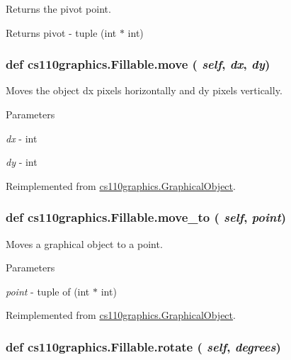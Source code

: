Returns the pivot point. \begin{DoxyReturn}{Returns}
pivot -\/ tuple (int $\ast$ int) 
\end{DoxyReturn}
\hypertarget{classcs110graphics_1_1Fillable_ae8f6c476e29c0810453dc16948e1730c}{
\subsubsection[{move}]{\setlength{\rightskip}{0pt plus 5cm}def cs110graphics.Fillable.move ( {\em self}, \/   {\em dx}, \/   {\em dy})}}
\label{classcs110graphics_1_1Fillable_ae8f6c476e29c0810453dc16948e1730c}


Moves the object dx pixels horizontally and dy pixels vertically. 
\begin{DoxyParams}{Parameters}
\item[{\em dx}]-\/ int \item[{\em dy}]-\/ int \end{DoxyParams}


Reimplemented from \hyperlink{classcs110graphics_1_1GraphicalObject_aa64d270fb83efa4a54e1a7953512f9cd}{cs110graphics.GraphicalObject}.\hypertarget{classcs110graphics_1_1Fillable_adcabc14e76d1160ff591b9ef7f3d6a97}{
\subsubsection[{move\_\-to}]{\setlength{\rightskip}{0pt plus 5cm}def cs110graphics.Fillable.move\_\-to ( {\em self}, \/   {\em point})}}
\label{classcs110graphics_1_1Fillable_adcabc14e76d1160ff591b9ef7f3d6a97}


Moves a graphical object to a point. 
\begin{DoxyParams}{Parameters}
\item[{\em point}]-\/ tuple of (int $\ast$ int) \end{DoxyParams}


Reimplemented from \hyperlink{classcs110graphics_1_1GraphicalObject_abe2d480265df7ac9447205c52c6946df}{cs110graphics.GraphicalObject}.\hypertarget{classcs110graphics_1_1Fillable_afa6710f6c314de39d19f06d9dd306d7d}{
\subsubsection[{rotate}]{\setlength{\rightskip}{0pt plus 5cm}def cs110graphics.Fillable.rotate ( {\em self}, \/   {\em degrees})}}
\label{classcs110graphics_1_1Fillable_afa6710f6c314de39d19f06d9dd306d7d}


